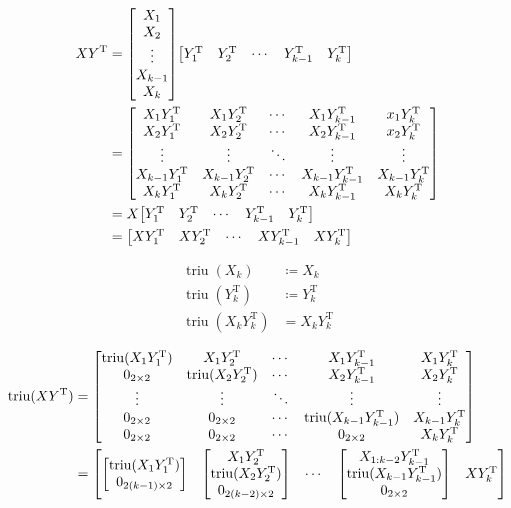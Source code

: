 \documentclass[11pt]{article}
\newcommand{\triu}{\mathop{\mathrm{triu}}}
\newcommand{\T}{\mathrm{T}}
\begin{document}
\begin{align*}
    XY^{\T} &= \mqty[
        X_{1} \\
        X_{2} \\
        \vdots \\
        X_{k-1} \\
        X_{k}
        ]
        \mqty[
        Y_{1}^{\T} & Y_{2}^{\T} & \cdots & Y_{k-1}^{\T} & Y_{k}^{\T}
        ]\\
    &= \mqty[
        X_{1} Y_{1}^{\T} & X_{1} Y_{2}^{\T} & \cdots & X_{1} Y_{k-1}^{\T} & x_{1} Y_{k}^{\T}\\
        X_{2} Y_{1}^{\T} & X_{2} Y_{2}^{\T} & \cdots & X_{2} Y_{k-1}^{\T} & x_{2} Y_{k}^{\T}\\
        \vdots & \vdots & \ddots & \vdots & \vdots\\
        X_{k-1} Y_{1}^{\T} & X_{k-1} Y_{2}^{\T} & \cdots & X_{k-1} Y_{k-1}^{\T} & X_{k-1} Y_{k}^{\T}\\
        X_{k} Y_{1}^{\T} & X_{k} Y_{2}^{\T} & \cdots & X_{k} Y_{k-1}^{\T} & X_{k} Y_{k}^{\T}
        ]\\
    &= X\mqty[
        Y_{1}^{\T} & Y_{2}^{\T} & \cdots & Y_{k-1}^{\T} & Y_{k}^{\T}
            ]\\
    &= \mqty[
        XY_{1}^{\T} & XY_{2}^{\T} & \cdots & XY_{k-1}^{\T} & XY_{k}^{\T}
        ]
\end{align*}

\begin{align*}
    \triu(X_{k}) &\coloneqq X_{k} \\
    \triu(Y_{k}^{\T}) &\coloneqq Y_{k}^{\T} \\
    \triu(X_{k} Y_{k}^{\T}) &= X_{k} Y_{k}^{\T}
\end{align*}

\begin{align*}
    \triu(XY^{\T}) &= \mqty[
        \triu(X_{1} Y_{1}^{\T}) & X_{1} Y_{2}^{\T} & \cdots & X_{1} Y_{k-1}^{\T} & X_{1} Y_{k}^{\T}\\
        0_{2 \times 2} & \triu(X_{2} Y_{2}^{\T}) & \cdots & X_{2} Y_{k-1}^{\T} & X_{2} Y_{k}^{\T}\\
        \vdots & \vdots & \ddots & \vdots & \vdots\\
        0_{2 \times 2} & 0_{2 \times 2} & \cdots & \triu(X_{k-1} Y_{k-1}^{\T}) & X_{k-1} Y_{k}^{\T}\\
        0_{2 \times 2} & 0_{2 \times 2} & \cdots & 0_{2 \times 2} & X_{k} Y_{k}^{\T}
        ]\\
    &= \mqty[
        \mqty[
            \triu(X_{1} Y_{1}^{\T}) \\
            0_{2(k-1) \times 2}
            ] &
        \mqty[
            X_{1} Y_{2}^{\T} \\
            \triu(X_{2} Y_{2}^{\T}) \\
            0_{2(k-2) \times 2}
            ] &
        \cdots &
        \mqty[
            X_{1:k-2}Y_{k-1}^{\T} \\
            \triu(X_{k-1}Y_{k-1}^{\T}) \\
            0_{2 \times 2}
            ] &
        X Y_{k}^{\T}
        ]
\end{align*}
\end{document}
